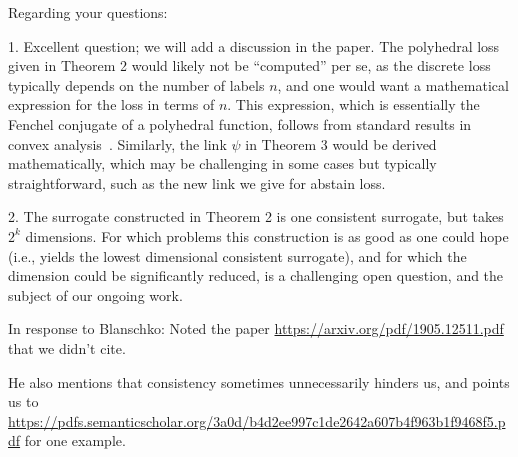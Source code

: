\documentclass{article}
\begin{document}
Regarding your questions:

1. Excellent question; we will add a discussion in the paper.
The polyhedral loss given in Theorem 2 would likely not be ``computed'' per se, as the discrete loss typically depends on the number of labels $n$, and one would want a mathematical expression for the loss in terms of $n$.
This expression, which is essentially the Fenchel conjugate of a polyhedral function, follows from standard results in convex analysis~\cite[Thm 19.1, Thm 19.2]{rockafellar1997convex}.
Similarly, the link $\psi$ in Theorem 3 would be derived mathematically, which may be challenging in some cases but typically straightforward, such as the new link we give for abstain loss.

2.
The surrogate constructed in Theorem 2 is one consistent surrogate, but takes $2^k$ dimensions.
For which problems this construction is as good as one could hope (i.e., yields the lowest dimensional consistent surrogate), and for which the dimension could be significantly reduced, is a challenging open question, and the subject of our ongoing work.

\bigskip
In response to Blanschko:
Noted the paper \url{https://arxiv.org/pdf/1905.12511.pdf} that we didn't cite.

He also mentions that consistency sometimes unnecessarily hinders us, and points us to \url{https://pdfs.semanticscholar.org/3a0d/b4d2ee997c1de2642a607b4f963b1f9468f5.pdf} for one example.



\end{document}
